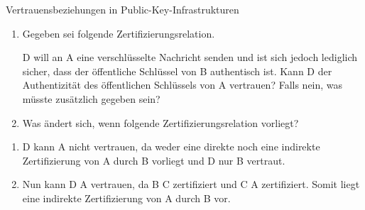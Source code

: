 \documentclass{article}
\begin{document}
\begin{exercise}{Vertrauensbeziehungen in Public-Key-Infrastrukturen}
  \begin{enumerate}
    \item Gegeben sei folgende Zertifizierungsrelation.
      
      D will an A eine verschlüsselte Nachricht senden und ist sich jedoch lediglich sicher, dass der öffentliche Schlüssel von B authentisch ist. Kann D der Authentizität des öffentlichen Schlüssels von A vertrauen? Falls nein, was müsste zusätzlich gegeben sein?
    \item Was ändert sich, wenn folgende Zertifizierungsrelation vorliegt?
    
  \end{enumerate}

  \begin{solution}
    \begin{enumerate}
      \item D kann A nicht vertrauen, da weder eine direkte noch eine indirekte Zertifizierung von A durch B vorliegt und D nur B vertraut.
      \item Nun kann D A vertrauen, da B C zertifiziert und C A zertifiziert. Somit liegt eine indirekte Zertifizierung von A durch B vor.
    \end{enumerate}
  \end{solution}
\end{exercise}
\end{document}
